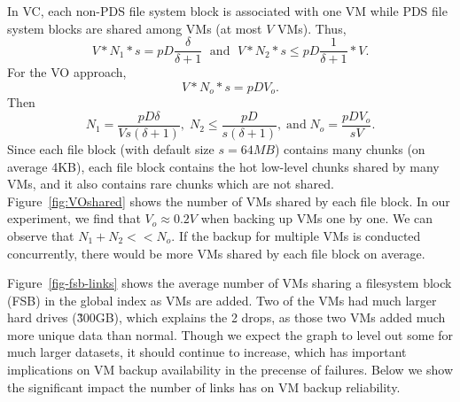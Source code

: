In VC, each non-PDS file system block is associated with one VM while PDS file system blocks are
shared among VMs  (at most $V$ VMs). Thus, 
\[
V *N_1 *s  = pD  \frac{\delta} {\delta +1} \; \mbox{ and } \; 
V *N_2 *s  \leq pD  \frac{1} {\delta +1} *V.
\]
For the VO approach, 
\[
V *N_o *s  = pD  V_o.
\]
Then
\[
N_1= \frac{pD \delta} {V s (\delta +1)},\; 
N_2 \leq \frac{pD } {s (\delta +1)}, \; 
\mbox{and} \; N_o = \frac{pD V_o } {s V}.
\]
Since each file block (with default size $s=64MB$) contains many chunks (on average 4KB),
each file block contains the hot low-level chunks shared by many VMs, and it also contains
rare chunks which are not shared.
Figure~\ref{fig:VOshared} shows the number of VMs shared by each file block.
In our experiment, we find that $V_o \approx 0.2 V$ when backing up VMs one by one.
We can observe that $N_1 +N_2 << N_o$.
If  the backup for multiple VMs is conducted concurrently, there would be more
VMs shared  by each file block on average.

Figure~\ref{fig-fsb-links} shows the average number of VMs sharing a
filesystem block (FSB) in the global index as VMs are added. Two of the VMs had
much larger hard drives (\~300GB), which explains the 2 drops, as those two VMs
added much more unique data than normal. Though we expect the graph to level out some for
much larger datasets, it should continue to increase, which has important implications
on VM backup availability in the precense of failures. Below we show the
significant impact the number of links has on VM backup reliability.


